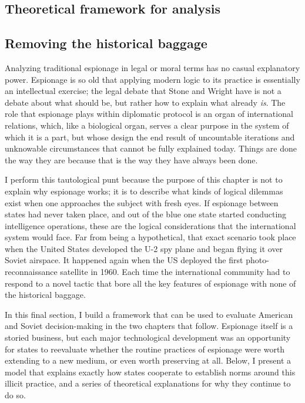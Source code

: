 \documentclass[11pt]{memoir}
\begin{document}
\begin{refsegment}

\section{Theoretical framework for analysis}
\subsection{Removing the historical baggage}
Analyzing traditional espionage in legal or moral terms has no casual explanatory power. Espionage is so old that applying modern logic to its practice is essentially an intellectual exercise; the legal debate that Stone and Wright have is not a debate about what should be, but rather how to explain what already \emph{is}. The role that espionage plays within diplomatic protocol is an organ of international relations, which, like a biological organ, serves a clear purpose in the system of which it is a part, but whose design the end result of uncountable iterations and unknowable circumstances that cannot be fully explained today. Things are done the way they are because that is the way they have always been done.

I perform this tautological punt because the purpose of this chapter is not to explain why espionage works; it is to describe what kinds of logical dilemmas exist when one approaches the subject with fresh eyes. If espionage between states had never taken place, and out of the blue one state started conducting intelligence operations, these are the logical considerations that the international system would face. Far from being a hypothetical, that exact scenario took place when the United States developed the U-2 spy plane and began flying it over Soviet airspace. It happened again when the US deployed the first photo-reconnaissance satellite in 1960. Each time the international community had to respond to a novel tactic that bore all the key features of espionage with none of the historical baggage.

In this final section, I build a framework that can be used to evaluate American and Soviet decision-making in the two chapters that follow. Espionage itself is a storied business, but each major technological development was an opportunity for states to reevaluate whether the routine practices of espionage were worth extending to a new medium, or even worth preserving at all. Below, I present a model that explains exactly how states cooperate to establish norms around this illicit practice, and a series of theoretical explanations for why they continue to do so.


\end{refsegment}
\end{document}
